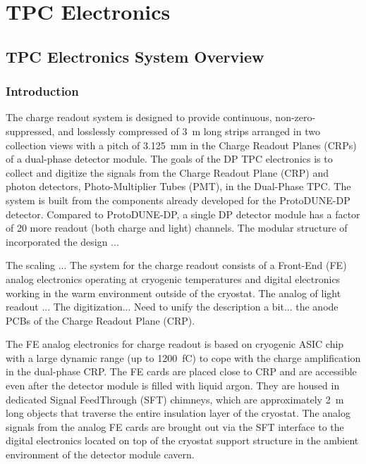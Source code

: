 \chapter{TPC Electronics}
\label{ch:fddp-tpc-elec}


\section{TPC Electronics System Overview}
\label{sec:fddp-tpc-elec-ov}

\subsection{Introduction}
\label{sec:fddp-tpc-elec-intro}

The charge readout system is designed to provide continuous, non-zero-suppressed, and losslessly compressed of \SI{3}{m} long strips arranged in two collection views with a pitch of \SI{3.125}{mm} in the Charge Readout Planes (CRPs) of a dual-phase detector module. The goals of the DP TPC electronics is to collect and digitize the signals from the Charge Readout Plane (CRP) and photon detectors, Photo-Multiplier Tubes (PMT), in the Dual-Phase TPC. The system is built from the components already developed for the ProtoDUNE-DP detector. Compared to ProtoDUNE-DP, a single DP detector module has a factor of 20 more readout (both charge and light) channels. The modular structure of incorporated the design ... 

The scaling ...  
The system for the charge readout consists of a Front-End (FE) analog electronics operating at cryogenic temperatures and digital electronics working in the warm environment outside of the cryostat. The analog of light readout ... The digitization... Need to unify the description a bit... 
the anode PCBs of the Charge Readout Plane (CRP).

The FE analog electronics for charge readout is based on cryogenic ASIC chip with a large dynamic range (up to \SI{1200}{fC}) to cope with the charge amplification in the dual-phase CRP. The FE cards are placed close to CRP and are accessible even after the detector module is filled with liquid argon. They are housed in dedicated Signal FeedThrough (SFT) chimneys, which are approximately \SI{2}{m} long objects that traverse the entire insulation layer of the cryostat.  The analog signals from the analog FE cards are brought out via the SFT interface to the digital electronics located on top of the cryostat support structure in the ambient environment of the detector module cavern. 

